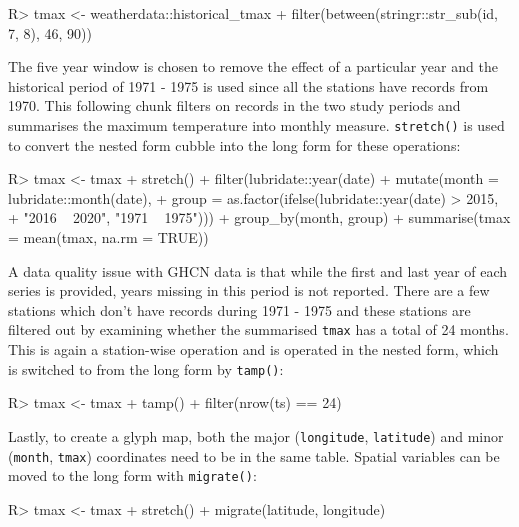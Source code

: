 \documentclass[
]{jss}
\begin{document}
\begin{CodeChunk}
\begin{CodeInput}
R> tmax <- weatherdata::historical_tmax %
+   filter(between(stringr::str_sub(id, 7, 8), 46, 90))
\end{CodeInput}
\end{CodeChunk}

The five year window is chosen to remove the effect of a particular year
and the historical period of 1971 - 1975 is used since all the stations
have records from 1970. This following chunk filters on records in the
two study periods and summarises the maximum temperature into monthly
measure. \texttt{stretch()} is used to convert the nested form cubble
into the long form for these operations:

\begin{CodeChunk}
\begin{CodeInput}
R> tmax <- tmax %
+   stretch() %
+   filter(lubridate::year(date) %
+   mutate(month = lubridate::month(date), 
+          group = as.factor(ifelse(lubridate::year(date) > 2015, 
+                                   "2016 ~ 2020", "1971 ~ 1975"))) %
+   group_by(month, group) %
+   summarise(tmax = mean(tmax, na.rm = TRUE))
\end{CodeInput}
\end{CodeChunk}

A data quality issue with GHCN data is that while the first and last
year of each series is provided, years missing in this period is not
reported. There are a few stations which don't have records during 1971
- 1975 and these stations are filtered out by examining whether the
summarised \texttt{tmax} has a total of 24 months. This is again a
station-wise operation and is operated in the nested form, which is
switched to from the long form by \texttt{tamp()}:

\begin{CodeChunk}
\begin{CodeInput}
R> tmax <- tmax %
+   tamp() %
+   filter(nrow(ts) == 24) 
\end{CodeInput}
\end{CodeChunk}

Lastly, to create a glyph map, both the major (\texttt{longitude},
\texttt{latitude}) and minor (\texttt{month}, \texttt{tmax}) coordinates
need to be in the same table. Spatial variables can be moved to the long
form with \texttt{migrate()}:

\begin{CodeChunk}
\begin{CodeInput}
R> tmax <- tmax %
+   stretch() %
+   migrate(latitude, longitude)
\end{CodeInput}
\end{CodeChunk}
\end{document}
